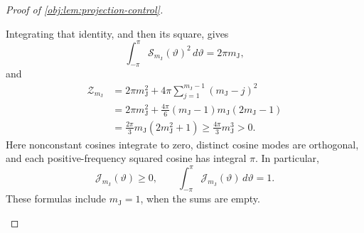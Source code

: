 \begin{proof}[Proof of \cref{obj:lem:projection-control}]
\begin{enumerate}
Integrating that identity, and then its square, gives
\[
\int_{-\pi}^{\pi}\mathcal S_{m_{\mathrm J}}(\vartheta)^2\,d\vartheta
=2\pi m_{\mathrm J},
\]
and
\[
\begin{aligned}
\mathcal Z_{m_{\mathrm J}}
&=2\pi m_{\mathrm J}^2
  +4\pi\sum_{j=1}^{m_{\mathrm J}-1}(m_{\mathrm J}-j)^2\\
&=2\pi m_{\mathrm J}^2
  +\frac{4\pi}{6}(m_{\mathrm J}-1)m_{\mathrm J}(2m_{\mathrm J}-1)\\
&=\frac{2\pi}{3}m_{\mathrm J}(2m_{\mathrm J}^2+1)
 \ge\frac{4\pi}{3}m_{\mathrm J}^3>0.
\end{aligned}
\]
Here nonconstant cosines integrate to zero, distinct cosine modes are orthogonal, and each positive-frequency squared cosine has integral \(\pi\). In particular,
\[
\mathcal J_{m_{\mathrm J}}(\vartheta)\ge0,
\qquad
\int_{-\pi}^{\pi}\mathcal J_{m_{\mathrm J}}(\vartheta)\,d\vartheta=1.
\]
These formulas include \(m_{\mathrm J}=1\), when the sums are empty.


\end{enumerate}
\end{proof}
